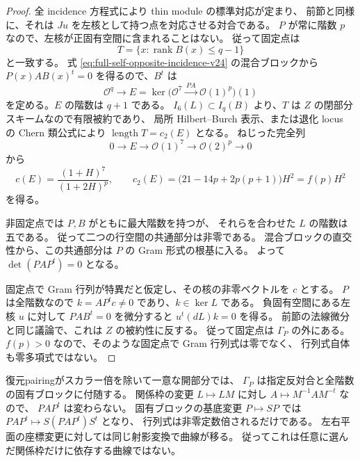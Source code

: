 \begin{proof}
全 incidence 方程式により thin module の標準対応が定まり、
前節と同様に、それは $Ju$ を左核として持つ点を対応させる対合である。
$P$ が常に階数 $p$ なので、左核が正固有空間に含まれることはない。
従って固定点は
\[
 T=\{x:\operatorname{rank}B(x)\leq q-1\}
\]
と一致する。
式 \eqref{eq:full-self-opposite-incidence-v24} の混合ブロックから
$P(x)AB(x)^t=0$ を得るので、$B^t$ は
\[
 \mathcal O^q\longrightarrow
 E=\ker\bigl(\mathcal O^7\xrightarrow{\,PA\,}\mathcal O(1)^p\bigr)(1)
\]
を定める。$E$ の階数は $q+1$ である。
$I_6(L)\subset I_q(B)$ より、$T$ は $Z$ の閉部分スキームなので有限被約であり、
局所 Hilbert--Burch 表示、または退化 locus の Chern 類公式により
$\operatorname{length}T=c_2(E)$ となる\cite[\S14.4]{FultonIntersection}。
ねじった完全列
\[
 0\longrightarrow E\longrightarrow\mathcal O(1)^7
  \longrightarrow\mathcal O(2)^p\longrightarrow0
\]
から
\[
 c(E)=\frac{(1+H)^7}{(1+2H)^p},\qquad
 c_2(E)=\bigl(21-14p+2p(p+1)\bigr)H^2=f(p)H^2
\]
を得る。

非固定点では $P,B$ がともに最大階数を持つが、
それらを合わせた $L$ の階数は五である。
従って二つの行空間の共通部分は非零である。
混合ブロックの直交性から、この共通部分は $P$ の Gram 形式の根基に入る。
よって $\det(PAP^t)=0$ となる。

固定点で Gram 行列が特異だと仮定し、その核の非零ベクトルを $c$ とする。
$P$ は全階数なので $k=AP^tc\ne0$ であり、$k\in\ker L$ である。
負固有空間にある左核 $u$ に対して $PAB^t=0$ を微分すると
$u^t(dL)k=0$ を得る。
前節の法線微分と同じ議論で、これは $Z$ の被約性に反する。
従って固定点は $\Gamma_P$ の外にある。
$f(p)>0$ なので、そのような固定点で Gram 行列式は零でなく、
行列式自体も零多項式ではない。
\end{proof}

\begin{remark}[行列式曲線の基底不変性]
復元pairingがスカラー倍を除いて一意な開部分では、
$\Gamma_P$ は指定反対合と全階数の固有ブロックに付随する。
関係枠の変更 $L\mapsto LM$ に対し $A\mapsto M^{-1}AM^{-t}$ なので、
$PAP^t$ は変わらない。
固有ブロックの基底変更 $P\mapsto SP$ では $PAP^t\mapsto S(PAP^t)S^t$ となり、
行列式は非零定数倍されるだけである。
左右平面の座標変更に対しては同じ射影変換で曲線が移る。
従ってこれは任意に選んだ関係枠だけに依存する曲線ではない。
\end{remark}

